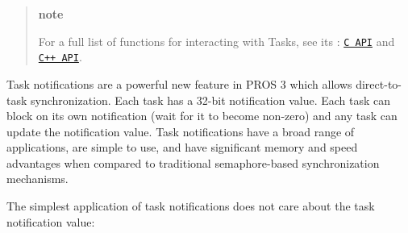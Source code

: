 \begin{quote}
{\bfseries note}

For a full list of functions for interacting with Tasks, see its \+: \href{../../api/c/rtos.html}{\tt C A\+PI} and \href{../../api/cpp/rtos.html}{\tt C++ A\+PI}.

\end{quote}
Task notifications are a powerful new feature in P\+R\+OS 3 which allows direct-\/to-\/task synchronization. Each task has a 32-\/bit notification value. Each task can block on its own notification (wait for it to become non-\/zero) and any task can update the notification value. Task notifications have a broad range of applications, are simple to use, and have significant memory and speed advantages when compared to traditional semaphore-\/based synchronization mechanisms.

The simplest application of task notifications does not care about the task notification value\+: 